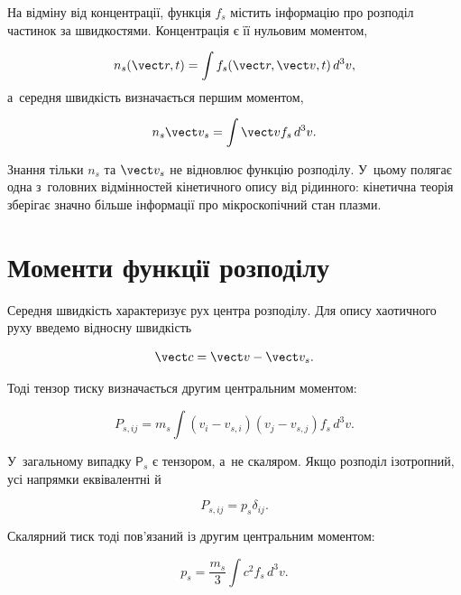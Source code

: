 На відміну від концентрації, функція $f_s$ містить інформацію про розподіл частинок за
швидкостями. Концентрація є її нульовим моментом,

\begin{equation}\label{eq:kinetic-density}
 n_s(\vect r,t)=\int f_s(\vect r,\vect v,t)\,d^3v,
\end{equation}
%
а~середня швидкість визначається першим моментом,

\begin{equation}\label{eq:kinetic-velocity}
 n_s\vect v_s=\int \vect v f_s\,d^3v.
\end{equation}

Знання тільки $n_s$ та $\vect v_s$ не відновлює функцію розподілу. У~цьому полягає одна
з~головних відмінностей кінетичного опису від рідинного: кінетична теорія зберігає значно
більше інформації про мікроскопічний стан плазми.

\section{Моменти функції розподілу}

Середня швидкість характеризує рух центра розподілу. Для опису хаотичного руху введемо
відносну швидкість

\begin{equation*}
\vect c=\vect v-\vect v_s.
\end{equation*}

Тоді тензор тиску визначається другим центральним моментом:

\begin{equation}\label{eq:pressure-tensor}
 P_{s,ij}
 =
 m_s\int
 (v_i-v_{s,i})(v_j-v_{s,j})f_s\,d^3v.
\end{equation}

У~загальному випадку $\mathsf P_s$ є тензором, а~не скаляром. Якщо розподіл ізотропний,
усі напрямки еквівалентні й

\begin{equation}\label{eq:isotropic-pressure}
 P_{s,ij}=p_s\delta_{ij}.
\end{equation}

Скалярний тиск тоді пов'язаний із другим центральним моментом:

\begin{equation}\label{eq:pressure-energy}
 p_s=\frac{m_s}{3}\int c^2 f_s\,d^3v.
\end{equation}

